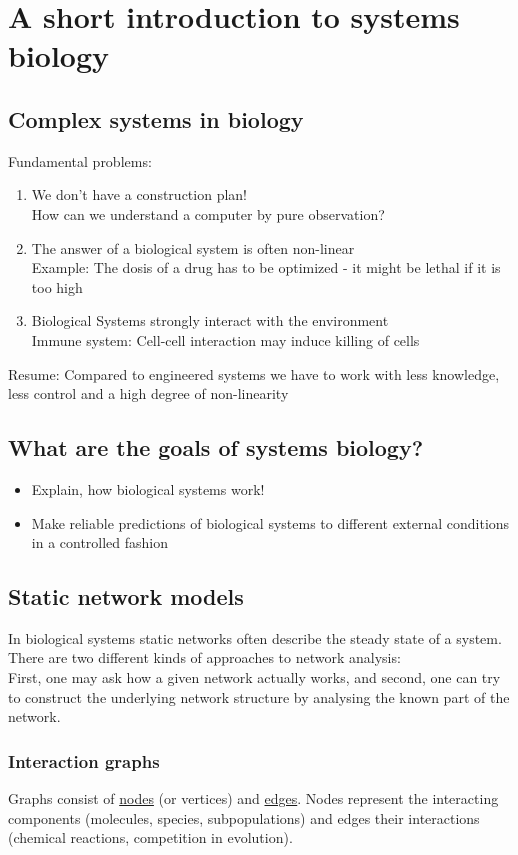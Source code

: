 \section{A short introduction to systems biology}
\subsection{Complex systems in biology}
Fundamental problems:
\begin{enumerate}[label={\arabic*)}]
\item We don't have a construction plan!\\
How can we understand a computer by pure observation?
\item The answer of a biological system is often non-linear\\
Example: The dosis of a drug has to be optimized - it might be lethal if it is too high
\item Biological Systems strongly interact with the environment\\
Immune system: Cell-cell interaction may induce killing of cells
\end{enumerate}
Resume: Compared to engineered systems we have to work with less knowledge, less control and a high degree of non-linearity
\subsection*{What are the goals of systems biology?}
\begin{itemize}[label={$-$}]
\item Explain, how biological systems work!
\item Make reliable predictions of biological systems to different external conditions in a controlled fashion
\end{itemize}
\subsection{Static network models}
In biological systems static networks often describe the steady state of a system. There are two different kinds of approaches to network analysis:\\
First, one may ask how a given network actually works, and second, one can try to construct the underlying network structure by analysing the known part of the network.
\subsubsection{Interaction graphs}
Graphs consist of \underline{nodes} (or vertices) and \underline{edges}. Nodes represent the interacting components (molecules, species, subpopulations) and edges their interactions (chemical reactions, competition in evolution).
